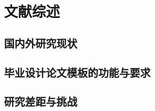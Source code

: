 \documentclass[../main.tex]{subfiles}
\begin{document}
\chapter{文献综述}

\section{国内外研究现状}

\section{毕业设计论文模板的功能与要求}

\section{研究差距与挑战}
\end{document}
